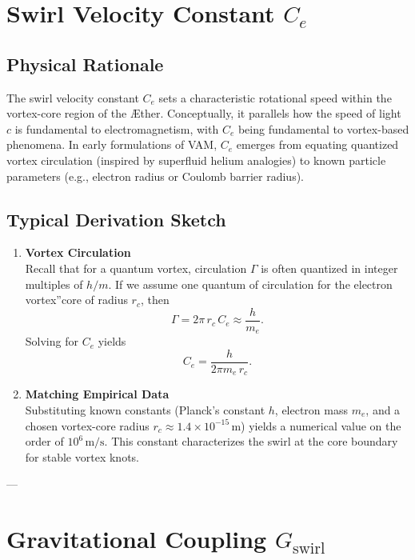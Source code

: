 \section{Swirl Velocity Constant \(C_e\)}

\subsection{Physical Rationale}
The swirl velocity constant \(C_e\) sets a characteristic rotational speed within the vortex-core region of the Æther. Conceptually, it parallels how the speed of light \(c\) is fundamental to electromagnetism, with \(C_e\) being fundamental to vortex-based phenomena. In early formulations of VAM, \(C_e\) emerges from equating quantized vortex circulation (inspired by superfluid helium analogies) to known particle parameters (e.g., electron radius or Coulomb barrier radius).

\subsection{Typical Derivation Sketch}
\begin{enumerate}
    \item \textbf{Vortex Circulation} \\
    Recall that for a quantum vortex, circulation \(\Gamma\) is often quantized in integer multiples of \(h/m\). If we assume one quantum of circulation for the \grqq electron vortex\textquotedblright core of radius \(r_c\), then
    \[
        \Gamma = 2 \pi \,r_c \,C_e \approx \frac{h}{m_e}.
    \]
    Solving for \(C_e\) yields
    \[
        C_e  =  \frac{h}{2 \pi m_e \,r_c}.
    \]

    \item \textbf{Matching Empirical Data} \\
    Substituting known constants (Planck's constant \(h\), electron mass \(m_e\), and a chosen vortex-core radius \(r_c\approx 1.4\times 10^{-15}\,\mathrm{m}\)) yields a numerical value on the order of \(10^6\,\mathrm{m/s}\). This constant characterizes the swirl at the core boundary for stable vortex knots.
\end{enumerate}

---

\section{Gravitational Coupling \(G_\text{swirl}\)}

